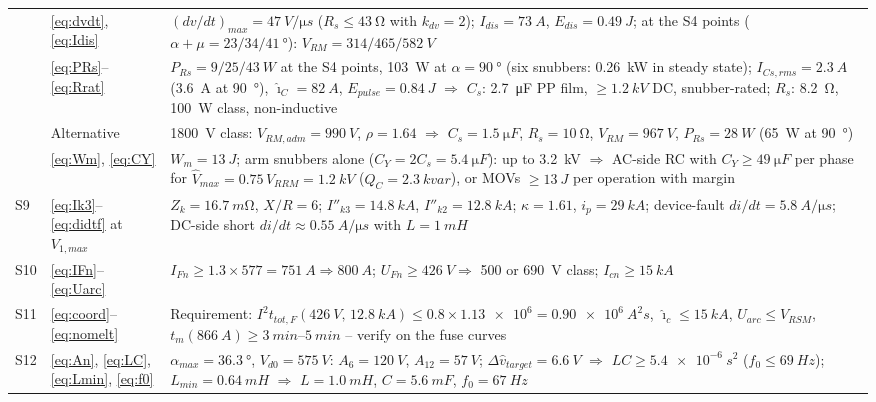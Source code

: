 \documentclass[10pt,a4paper]{scrartcl}
\newcommand{\Vdo}{V_{d0}}
\newcommand{\VRRM}{V_{RRM}}
\newcommand{\VRSM}{V_{RSM}}
\newcommand{\iit}{I^{2}t}
\begin{document}
{\begin{longtable}{@{}l>{\raggedright\arraybackslash}p{}>{\raggedright\arraybackslash}p{}@{}}
 & \eqref{eq:dvdt}, \eqref{eq:Idis} & $(dv/dt)_{max} = \SI{47}{V/\micro s}$ ($R_s \le \SI{43}{\ohm}$ with $k_{dv} = 2$); $I_{dis} = \SI{73}{A}$, $E_{dis} = \SI{0.49}{J}$; at the S4 points ($\alpha+\mu = 23/34/\SI{41}{\degree}$): $V_{RM} = 314/465/\SI{582}{V}$ \\
 & \eqref{eq:PRs}--\eqref{eq:Rrat} & $P_{Rs} = 9/25/\SI{43}{W}$ at the S4 points, \SI{103}{W} at $\alpha = \SI{90}{\degree}$ (six snubbers: \SI{0.26}{kW} in steady state); $I_{Cs,rms} = \SI{2.3}{A}$ (\SI{3.6}{A} at \SI{90}{\degree}), $\hat\imath_C = \SI{82}{A}$, $E_{pulse} = \SI{0.84}{J}$ $\Rightarrow$ $C_s$: \SI{2.7}{\micro F} PP film, $\ge\SI{1.2}{kV}$ DC, snubber-rated; $R_s$: \SI{8.2}{\ohm}, \SI{100}{W} class, non-inductive \\
 & Alternative & \SI{1800}{V} class: $V_{RM,adm} = \SI{990}{V}$, $\rho = 1.64$ $\Rightarrow$ $C_s = \SI{1.5}{\micro F}$, $R_s = \SI{10}{\ohm}$, $V_{RM} = \SI{967}{V}$, $P_{Rs} = \SI{28}{W}$ (\SI{65}{W} at \SI{90}{\degree}) \\
 & \eqref{eq:Wm}, \eqref{eq:CY} & $W_m = \SI{13}{J}$; arm snubbers alone ($C_Y = 2C_s = \SI{5.4}{\micro F}$): up to \SI{3.2}{kV} $\Rightarrow$ AC-side RC with $C_Y \ge \SI{49}{\micro F}$ per phase for $\hat V_{max} = 0.75\,\VRRM = \SI{1.2}{kV}$ ($Q_C = \SI{2.3}{kvar}$), or MOVs $\ge\SI{13}{J}$ per operation with margin \\
S9 & \eqref{eq:Ik3}--\eqref{eq:didtf} at $V_{1,max}$ & $Z_k = \SI{16.7}{m\ohm}$, $X/R = 6$; $I''_{k3} = \SI{14.8}{kA}$, $I''_{k2} = \SI{12.8}{kA}$; $\kappa = 1.61$, $i_p = \SI{29}{kA}$; device-fault $di/dt = \SI{5.8}{A/\micro s}$; DC-side short $di/dt \approx \SI{0.55}{A/\micro s}$ with $L = \SI{1}{mH}$ \\
S10 & \eqref{eq:IFn}--\eqref{eq:Uarc} & $I_{Fn} \ge 1.3\times577 = \SI{751}{A} \Rightarrow \SI{800}{A}$; $U_{Fn} \ge \SI{426}{V} \Rightarrow$ 500 or \SI{690}{V} class; $I_{cn} \ge \SI{15}{kA}$ \\
S11 & \eqref{eq:coord}--\eqref{eq:nomelt} & Requirement: $\iit_{tot,F}(\SI{426}{V},\,\SI{12.8}{kA}) \le 0.8\times\num{1.13e6} = \SI{0.90e6}{A^2 s}$, $\hat\imath_c \le \SI{15}{kA}$, $\hat U_{arc} \le \VRSM$, $t_m(\SI{866}{A}) \ge \SIrange{3}{5}{min}$ -- verify on the fuse curves \\
S12 & \eqref{eq:An}, \eqref{eq:LC}, \eqref{eq:Lmin}, \eqref{eq:f0} & $\alpha_{max} = \SI{36.3}{\degree}$, $\Vdo = \SI{575}{V}$: $A_6 = \SI{120}{V}$, $A_{12} = \SI{57}{V}$; $\Delta\hat v_{target} = \SI{6.6}{V}$ $\Rightarrow$ $LC \ge \SI{5.4e-6}{s^2}$ ($f_0 \le \SI{69}{Hz}$); $L_{min} = \SI{0.64}{mH}$ $\Rightarrow$ $L = \SI{1.0}{mH}$, $C = \SI{5.6}{mF}$, $f_0 = \SI{67}{Hz}$ \\

\end{longtable}}
\end{document}
